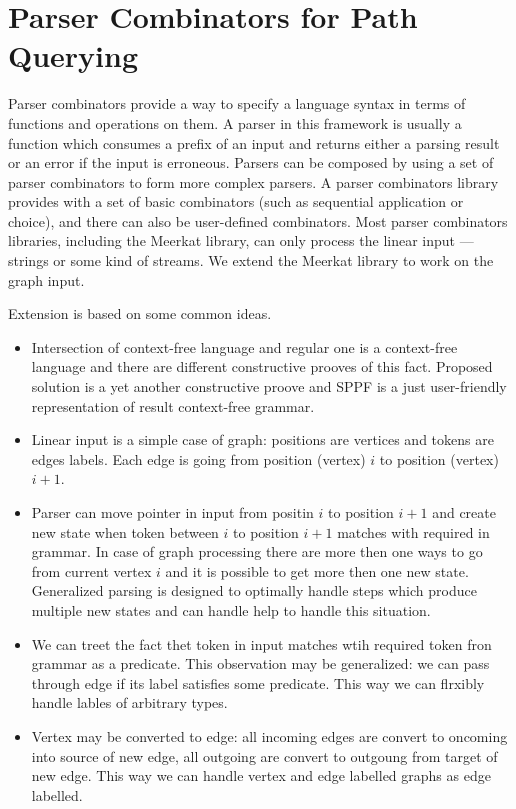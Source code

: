  \section{Parser Combinators for Path Querying}

Parser combinators provide a way to specify a language syntax in terms of functions and operations on them. 
A parser in this framework is usually a function which consumes a prefix of an input and returns either a parsing result or an error if the input is erroneous. 
Parsers can be composed by using a set of parser combinators to form more complex parsers. 
A parser combinators library provides with a set of basic combinators (such as sequential application or choice), and there can also be user-defined combinators. 
Most parser combinators libraries, including the Meerkat library, can only process the linear input --- strings or some kind of streams. 
We extend the Meerkat library to work on the graph input.

Extension is based on some common ideas.
\begin{itemize}
\item Intersection of context-free language and regular one is a context-free language and there are different constructive prooves of this fact.
Proposed solution is a yet another constructive proove and SPPF is a just user-friendly representation of result context-free grammar.
\item Linear input is a simple case of graph: positions are vertices and tokens are edges labels.
Each edge is going from position (vertex) $i$ to position (vertex) $i+1$.
\item Parser can move pointer in input from positin $i$ to position $i+1$ and create new state when token between $i$ to position $i+1$ matches with required in grammar.
In case of graph processing there are more then one ways to go from current vertex $i$ and it is possible to get more then one new state.
Generalized parsing is designed to optimally handle steps which produce multiple new states and can handle help to handle this situation.
\item We can treet the fact thet token in input matches wtih required token fron grammar as a predicate.
This observation may be generalized: we can pass through  edge if its label satisfies some predicate.
This way we can flrxibly handle lables of arbitrary types.
\item Vertex may be converted to edge: all incoming edges are convert to oncoming into source of new edge, all outgoing are convert to outgoung from target of new edge.
This way we can handle vertex and edge labelled graphs as edge labelled.
\end{itemize}


